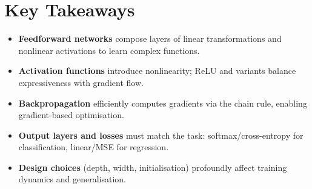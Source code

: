 
\section*{Key Takeaways}

\begin{keytakeaways}
\begin{itemize}[leftmargin=2em]
    \item \textbf{Feedforward networks} compose layers of linear transformations and nonlinear activations to learn complex functions.
    \item \textbf{Activation functions} introduce nonlinearity; ReLU and variants balance expressiveness with gradient flow.
    \item \textbf{Backpropagation} efficiently computes gradients via the chain rule, enabling gradient-based optimisation.
    \item \textbf{Output layers and losses} must match the task: softmax/cross-entropy for classification, linear/MSE for regression.
    \item \textbf{Design choices} (depth, width, initialisation) profoundly affect training dynamics and generalisation.
\end{itemize}
\end{keytakeaways}


